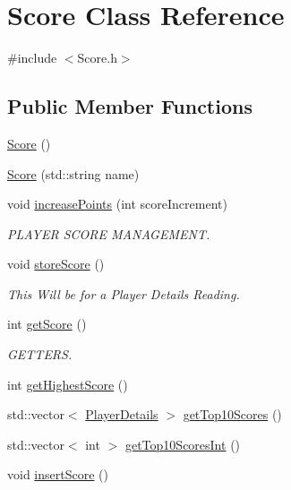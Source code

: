 \hypertarget{class_score}{}\section{Score Class Reference}
\label{class_score}


{\ttfamily \#include $<$Score.\+h$>$}

\subsection*{Public Member Functions}
\begin{DoxyCompactItemize}
\item 
\hyperlink{class_score_a039c99843551e5e4b512ecee99e46617}{Score} ()
\item 
\hyperlink{class_score_a7511b13acf59479d50c2c202d579168c}{Score} (std\+::string name)
\item 
void \hyperlink{class_score_a017f4ad80df1e9d51e62789d8e5e9605}{increase\+Points} (int score\+Increment)
\begin{DoxyCompactList}\small\item\em P\+L\+A\+Y\+ER S\+C\+O\+RE M\+A\+N\+A\+G\+E\+M\+E\+NT. \end{DoxyCompactList}\item 
void \hyperlink{class_score_a8cc9e62ee4d086c0f2e1b8ef6d2cbf8d}{store\+Score} ()
\begin{DoxyCompactList}\small\item\em This Will be for a Player Details Reading. \end{DoxyCompactList}\item 
int \hyperlink{class_score_a8627c93270c188a3fd28a25b1d07a9e7}{get\+Score} ()
\begin{DoxyCompactList}\small\item\em G\+E\+T\+T\+E\+RS. \end{DoxyCompactList}\item 
int \hyperlink{class_score_afb50f4e2cb31006d23d3281dd1703880}{get\+Highest\+Score} ()
\item 
std\+::vector$<$ \hyperlink{struct_player_details}{Player\+Details} $>$ \hyperlink{class_score_a13094831f08b313321193e212862417b}{get\+Top10\+Scores} ()
\item 
std\+::vector$<$ int $>$ \hyperlink{class_score_a5f1d05dd49200b53b806751a6e9d6fbe}{get\+Top10\+Scores\+Int} ()
\item 
void \hyperlink{class_score_ab207e77378c558c261526487aa725db9}{insert\+Score} ()
\end{DoxyCompactItemize}


